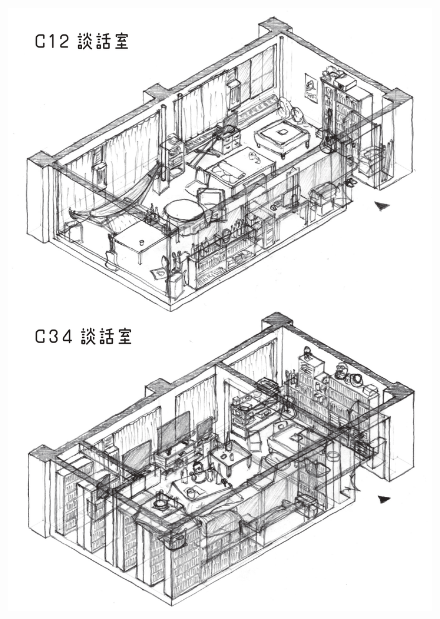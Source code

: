 \newpage
\begin{figure}[bh]
\vspace{10mm}
\centering
\includegraphics[]{gazo/談話室sketch_page-0005.jpg}
\end{figure}